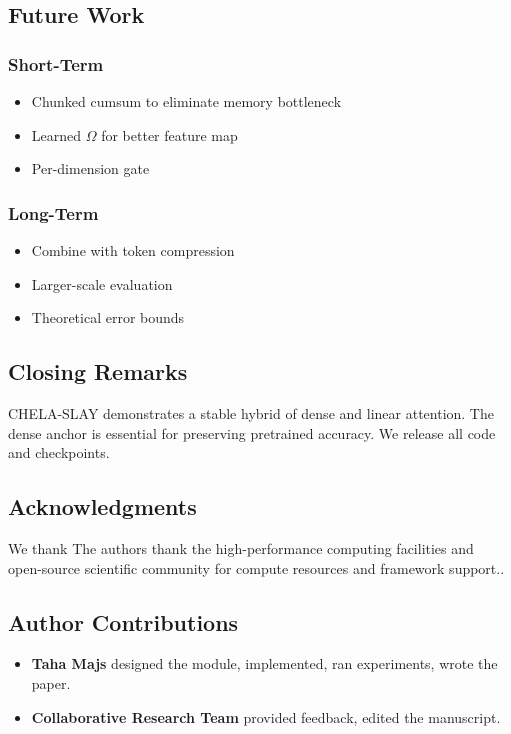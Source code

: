 \subsection{Future Work}

\subsubsection{Short-Term}
\begin{itemize}
\item Chunked cumsum to eliminate memory bottleneck
\item Learned $\Omega$ for better feature map
\item Per-dimension gate

\end{itemize}
\subsubsection{Long-Term}
\begin{itemize}
\item Combine with token compression
\item Larger-scale evaluation
\item Theoretical error bounds

\end{itemize}
\subsection{Closing Remarks}

CHELA-SLAY demonstrates a stable hybrid of dense and linear attention. The 
dense anchor is essential for preserving pretrained accuracy. We release all 
code and checkpoints.

\subsection{Acknowledgments}

We thank The authors thank the high-performance computing facilities and open-source scientific community for compute resources and framework support..

\subsection{Author Contributions}

\begin{itemize}
\item \textbf{Taha Majs} designed the module, implemented, ran experiments, wrote
  the paper.
\item \textbf{Collaborative Research Team} provided feedback, edited the manuscript.

\end{itemize}

